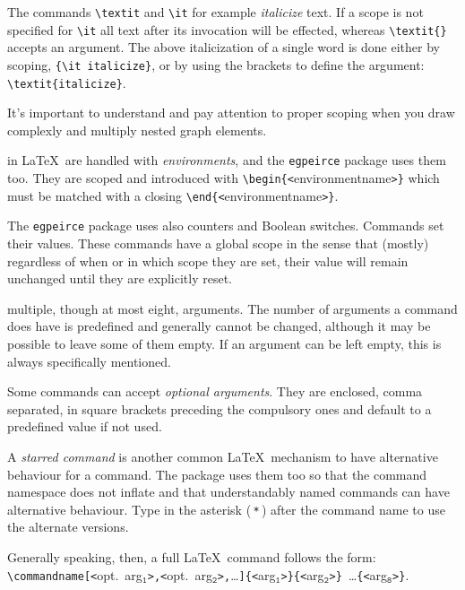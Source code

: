 \documentclass[a4paper,justified]{tufte-handout}
\begin{document}
The commands \verb|\textit| and \verb|\it| for example \textit{italicize} text. If a scope is not specified for \verb|\it| all text after its invocation will be effected, whereas \verb|\textit{}| accepts an argument. The above italicization of a single word is done either by scoping, \verb|{\it italicize}|, or by using the brackets to define the argument: \verb|\textit{italicize}|.

It's important to understand and pay attention to proper scoping when you draw complexly and multiply nested graph elements.

 in \LaTeX\ are handled with \textit{environ\-ments}, and the \texttt{egpeirce} package uses them too. They are scoped and introduced with \verb|\begin{<|{\Fontauri environmentname}\verb|>}| which must be matched with a closing \verb|\end{<|{\Fontauri environmentname}\verb|>}|. 

The \texttt{egpeirce} package uses also counters and Boolean switches. Commands set their values. These commands have a global scope in the sense that (mostly) regardless of when or in which scope they are set, their value will remain unchanged until they are explicitly reset.

 multiple, though at most eight, arguments. The number of arguments a command does have is predefined and generally cannot be changed, although it may be possible to leave some of them empty. If an argument can be left empty, this is always specifically mentioned.

Some commands can accept \textit{optional arguments}. They are enclosed, comma separated, in square brackets preceding the compulsory ones and default to a predefined value if not used.

A \textit{starred command} is another common \LaTeX\ mechanism to have alternative behaviour for a command. The package uses them too so that the command namespace does not inflate and that understandably named commands can have alternative behaviour. Type in the asterisk (\,\verb|*|\,) after the command name to use the alternate versions.

Generally speaking, then, a full \LaTeX\ command follows the form: \verb|\commandname[<|{\Fontauri opt.\ arg}$_\texttt{1}$\verb|>,<|{\Fontauri opt.\ arg}$_\texttt{2}$\verb|>,|\dots \verb|]{<|{\Fontauri arg}$_\texttt{1}$\verb|>}{<|{\Fontauri arg}$_\texttt{2}$\verb|>}|~\dots\verb|{<|{\Fontauri arg}$_\texttt{8}$\verb|>}|.
\end{document}
